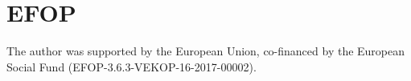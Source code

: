 \documentclass[runningheads,a4paper]{report}
\theoremstyle{definition}
\begin{document}
\section{EFOP}

{\Large The author was supported by the European Union, co-financed by the European Social Fund (EFOP-3.6.3-VEKOP-16-2017-00002).}


\newpage
{}


  
% 


{}




\end{document}
